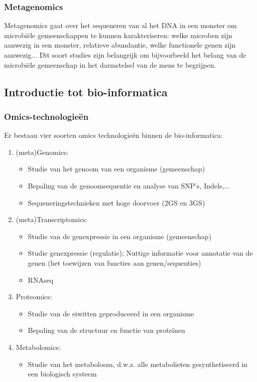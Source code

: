 \documentclass[a4paper,kul]{kulakarticle} %
\begin{document}
\subsubsection{Metagenomics}
Metagenomics gaat over het sequeneren van al het DNA in een monster om microbiële gemeenschappen te kunnen karakteriseren: welke microben zijn aanwezig in een monster, relatieve abundantie, welke functionele genen zijn aanwezig$\ldots$ Dit soort studies zijn belangrijk om bijvoorbeeld het belang van de microbiële gemeenschap in het darmstelsel van de mens te begrijpen. 
\newpage
\subsection{Introductie tot bio-informatica}
\subsubsection{Omics-technologieën}
Er bestaan vier soorten omics technologieën binnen de bio-informatica:
\begin{enumerate}
	\item (meta)Genomics:
		\begin{itemize}
			\item Studie van het genoom van een organisme
			(gemeenschap)
			\item Bepaling van de genoomsequentie en analyse van SNP's, Indels,...
			\item Sequeneringstechnieken met hoge doorvoer (2GS en 3GS)
		\end{itemize}
	\item (meta)Transcriptomics:
		\begin{itemize}
			\item Studie van de genexpressie in een
			organisme (gemeenschap)
			\item Studie genexpressie (regulatie); Nuttige informatie voor annotatie van
			de genen (het toewijzen van functies aan genen/sequenties)
			\item RNAseq
		\end{itemize}
	\item Proteomics:
		\begin{itemize}
			\item Studie van de eiwitten geproduceerd in een organisme
			\item Bepaling van de structuur en functie van proteïnen
		\end{itemize}
	\item Metabolomics:
		\begin{itemize}
			\item Studie van het metaboloom, d.w.z. alle metabolieten gesynthetiseerd
			in een biologisch systeem
		\end{itemize}
\end{enumerate}
\end{document}
